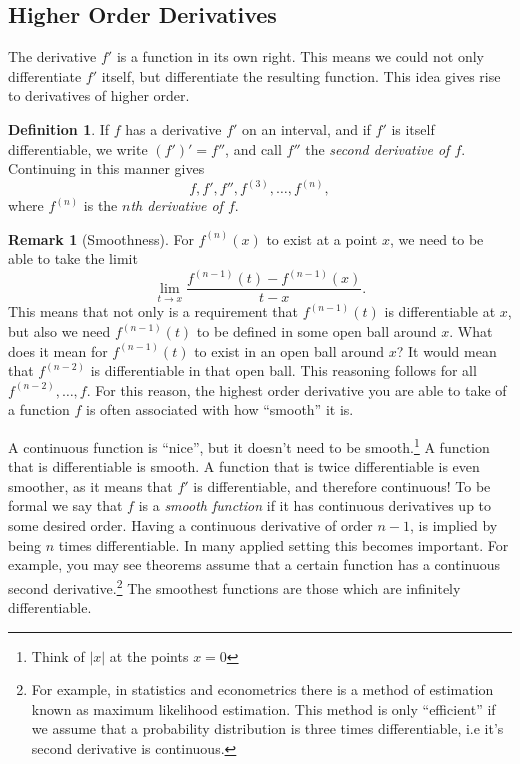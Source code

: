 \documentclass{article}
\theoremstyle{definition}
\newtheorem{definition}{Definition}[section]
\newtheorem{remark}{Remark}[section]
\begin{document}
	\subsection{Higher Order Derivatives}
	The derivative $ f' $ is a function in its own right. This means we could not only differentiate $ f' $ itself, but differentiate the resulting function. This idea gives rise to derivatives of higher order.
	\begin{definition}\label{def5.5}
		If $ f $ has a derivative $ f' $ on an interval, and if $ f' $ is itself differentiable, we write $  (f')'=f''$, and call $ f'' $ the \textit{\color{red}second derivative of $ f $}. Continuing in this manner gives $$ f,f',f'',f^{(3)},\ldots,f^{(n)},$$ where $ f^{(n)} $ is the \textit{\color{red}$ n $th derivative of $ f $}.  
	\end{definition}
	\begin{remark}[Smoothness]
		For $ f^{(n)}(x) $ to exist at a point $ x $, we need to be able to take the limit $$\lim_{t\to x}\frac{f^{(n-1)}(t)-f^{(n-1)}(x)}{t-x}. $$ This means that not only is a requirement that $ f^{(n-1)}(t) $ is differentiable at $ x $, but also we need $ f^{(n-1)}(t) $ to be defined in some open ball around $ x $. What does it mean for $ f^{(n-1)}(t) $ to exist in an open ball around $ x $? It would mean that $ f^{(n-2)} $ is differentiable in that open ball. This reasoning follows for all $ f^{(n-2)},\ldots, f $. For this reason, the highest order derivative you are able to take of a function $ f $ is often associated with how ``smooth'' it is.
		
		A continuous function is ``nice'', but it doesn't need to be smooth.\footnote{Think of $ |x| $ at the points $ x=0 $} A function that is differentiable is smooth. A function that is twice differentiable is even smoother, as it means that $ f' $ is differentiable, and therefore continuous! To be formal we say that $ f $ is a \textit{\color{red}smooth function} if it has continuous derivatives up to some desired order. Having a continuous derivative of order $ n-1 $, is implied by being $ n $ times differentiable.  In many applied setting this becomes important. For example, you may see theorems assume that a certain function has a continuous second derivative.\footnote{For example, in statistics and econometrics there is a method of estimation known as maximum likelihood estimation. This method is only ``efficient'' if we assume that a probability distribution is three times differentiable, i.e it's second derivative is continuous.} The smoothest functions are those which are infinitely differentiable. 
	\end{remark}
\end{document}
